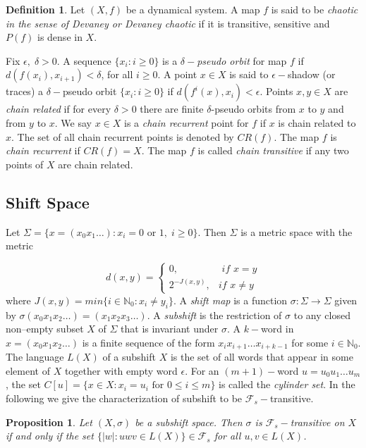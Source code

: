 \documentclass{amsart}[12pt, papera4]
\newtheorem{proposition}[theorem]{Proposition}
\theoremstyle{definition}
\newtheorem{definition}[theorem]{Definition}
\theoremstyle{remark}
\numberwithin{equation}{section}
\def\N{{\mathbb N}}
\def\F{{\mathscr{F}}}
\begin{document}
\smallskip
\begin{definition}
	Let $(X,f)$ be a dynamical system. 	A map $f$ is said to be \emph{chaotic in the sense of Devaney or Devaney chaotic} if it is transitive, sensitive and $P(f)$ is dense in $X$.
\end{definition} 


\smallskip
\noindent Fix $\epsilon,\; \delta>0$. A sequence $\{x_i:i\geq 0\}$ is a \emph{$\delta-$pseudo orbit} for map $f$ if $d(f(x_i),x_{i+1})<\delta$, for all $i\geq 0$. A point $x\in X$ is said to $\epsilon-$shadow (or traces) a $\delta-$pseudo orbit $\{x_i:i\geq 0\}$ if $d(f^i(x),x_i)<\epsilon$. Points $x,y\in X$ are \emph{chain related} if for every 
$\delta >0$ there are finite $\delta$-pseudo orbits from $x$ to $y$ and from $y$ to $x$. We say $x\in X$ is a \emph{chain recurrent} point for $f$ if $x$ is chain related to $x$. The set of all chain recurrent points is denoted by $CR(f)$. The map $f$ is \emph{chain recurrent} if $CR(f)=X$. The map $f$ is called \emph{chain transitive} if any two points of $X$ are chain related.


\subsection{Shift Space}
\noindent Let $\Sigma=\{x=(x_0x_1\dots):x_i =0 \text{ or } 1,\; i\geq 0\}$. Then $\Sigma$ is a metric space with the metric 

$$d\left(x, y\right)=\left \{\begin{array}{lll} 0, & \textit{ if } x=y \\ 
	2^{-J(x,y)}, & \textit{if } x\neq y \end{array} \right.$$ 
where $J(x,y)=\textit{min}\{i\in \N_0:x_i\neq y_i\}$. A \emph{shift map} is a function $\sigma : \Sigma \longrightarrow \Sigma$ given by $\sigma(x_0x_1x_2\dots)=(x_1x_2x_3\dots)$. A \emph{subshift} is the restriction of $\sigma$ to any closed non--empty subset $X$ of $\Sigma$ that is invariant under $\sigma$. A $k-$word in $x=(x_0x_1x_2\dots)$ is a finite sequence of the form $x_ix_{i+1}\dots x_{i+k-1}$ for some $i\in \N_0$. The language $L(X)$ of a subshift $X$ is the set of all words that appear in some element of $X$ together with empty word $\epsilon$. For an $(m+1)-$word $u=u_0u_1\dots u_m$, the set $C[u]=\{x\in X:x_i=u_i \mbox{ for } 0\leq i\leq m\}$ is called the \emph{cylinder set}. In the following we give the characterization of subshift to be $\F_s-$transitive.


\begin{proposition}\label{p1}
	Let $(X,\sigma)$ be a subshift space. Then $\sigma$ is $\F_s-$transitive on $X$ if and only if the set $\{|w|:uwv\in L(X)\}\in \F_s$ for all $u,v\in L(X)$.
\end{proposition}
\end{document}
